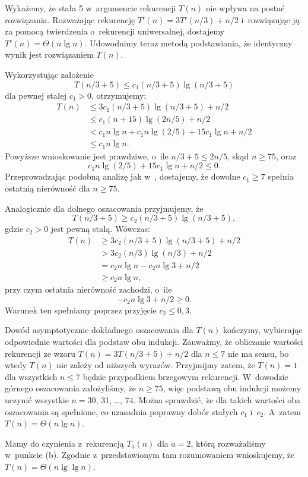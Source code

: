 \subproblem %
Wykażemy, że stała 5 w~argumencie rekurencji $T(n)$ nie wpływa na postać rozwiązania.
Rozważając rekurencję $T'(n)=3T'(n/3)+n/2$ i~rozwiązując ją za pomocą twierdzenia o~rekurencji uniwersalnej, dostajemy $T'(n)=\Theta(n\lg n)$.
Udowodnimy teraz metodą podstawiania, że identyczny wynik jest rozwiązaniem $T(n)$.

Wykorzystując założenie
\[
	T(n/3+5) \le c_1(n/3+5)\lg(n/3+5)
\]
dla pewnej stałej $c_1>0$, otrzymujemy:
\begin{align*}
	T(n) &\le 3c_1(n/3+5)\lg(n/3+5)+n/2 \\
	&\le c_1(n+15)\lg(2n/5)+n/2 \\
	&< c_1n\lg n+c_1n\lg(2/5)+15c_1\!\lg n+n/2 \\
	&\le c_1n\lg n.
\end{align*}
Powyższe wnioskowanie jest prawdziwe, o~ile $n/3+5\le2n/5$, skąd $n\ge75$, oraz
\[
	c_1n\lg(2/5)+15c_1\!\lg n+n/2 \le 0.
\]
Przeprowadzając podobną analizę jak w~, dostajemy, że dowolne $c_1\ge7$ spełnia ostatnią nierówność dla $n\ge75$.

Analogicznie dla dolnego oszacowania przyjmujemy, że
\[
	T(n/3+5) \ge c_2(n/3+5)\lg(n/3+5),
\]
gdzie $c_2>0$ jest pewną stałą.
Wówczas:
\begin{align*}
	T(n) &\ge 3c_2(n/3+5)\lg(n/3+5)+n/2 \\
	&> 3c_2(n/3)\lg(n/3)+n/2 \\
	&= c_2n\lg n-c_2n\lg3+n/2 \\
	&\ge c_2n\lg n,
\end{align*}
przy czym ostatnia nierówność zachodzi, o~ile
\[
	-c_2n\lg3+n/2 \ge 0.
\]
Warunek ten spełniamy poprzez przyjęcie $c_2\le0{,}3$.

Dowód asymptotycznie dokładnego oszacowania dla $T(n)$ kończymy, wybierając odpowiednie wartości dla podstaw obu indukcji.
Zauważmy, że obliczanie wartości rekurencji ze wzoru $T(n)=3T(n/3+5)+n/2$ dla $n\le7$ nie ma sensu, bo wtedy $T(n)$ nie zależy od niższych wyrazów.
Przyjmijmy zatem, że $T(n)=1$ dla wszystkich $n\le7$ będzie przypadkiem brzegowym rekurencji.
W~dowodzie górnego oszacowania założyliśmy, że $n\ge75$, więc podstawą obu indukcji możemy uczynić wszystkie $n=30$, 31, \dots, 74.
Można sprawdzić, że dla takich wartości oba oszacowania są spełnione, co uzasadnia poprawny dobór stałych $c_1$ i~$c_2$.
A~zatem $T(n)=\Theta(n\lg n)$.

\subproblem %
Mamy do czynienia z~rekurencją $T_a(n)$ dla $a=2$, którą rozważaliśmy w~punkcie (b).
Zgodnie z~przedstawionym tam rozumowaniem wnioskujemy, że $T(n)=\Theta(n\lg\lg n)$.

